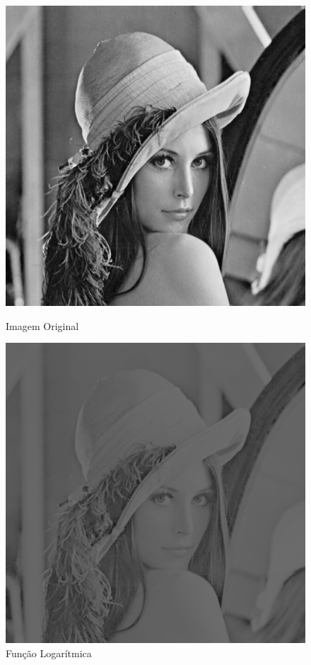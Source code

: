 \documentclass{article}
\begin{document}
\newpage
\begin{figure}[!htb]
\begin{minipage}[b]{0.45\linewidth}
\centering
\includegraphics[scale=0.32]{lena_B.png}
\caption{Imagem Original}
\label{fig:original}
\end{minipage}
\hspace{0.5cm}
\begin{minipage}[b]{0.45\linewidth}
\centering
\includegraphics[scale=0.32]{TransNLinearLog.png}
\caption{Função Logarítmica}
\label{fig:rota}
\end{minipage}
\end{figure}
\end{document}
